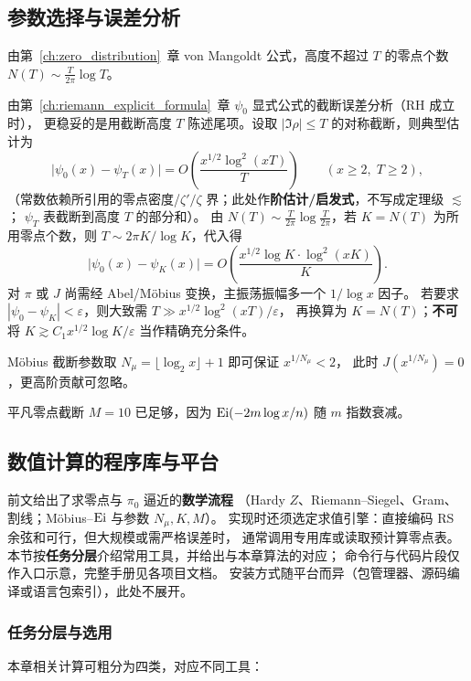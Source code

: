 \subsection{参数选择与误差分析}

由第~\ref{ch:zero_distribution}~章 von Mangoldt 公式，高度不超过 $T$ 的零点个数 $N(T) \sim \frac{T}{2\pi}\log T$。

由第~\ref{ch:riemann_explicit_formula}~章 $\psi_0$ 显式公式的截断误差分析（RH 成立时），
更稳妥的是用截断高度 $T$ 陈述尾项。设取 $|\Im\rho|\le T$ 的对称截断，则典型估计为
\[
\bigl|\psi_0(x)-\psi_T(x)\bigr|
=
O\!\left(
\frac{x^{1/2}\log^2(xT)}{T}
\right)
\qquad(x\ge2,\;T\ge2),
\]
（常数依赖所引用的零点密度/$\zeta'/\zeta$ 界；此处作\textbf{阶估计/启发式}，不写成定理级 $\lesssim$；
$\psi_T$ 表截断到高度 $T$ 的部分和）。
由 $N(T)\sim\frac{T}{2\pi}\log\frac{T}{2\pi}$，若 $K=N(T)$ 为所用零点个数，则
$T\sim 2\pi K/\log K$，代入得
\[
\bigl|\psi_0(x)-\psi_K(x)\bigr|
=
O\!\left(
\frac{x^{1/2}\log K\cdot\log^2(xK)}{K}
\right).
\]
对 $\pi$ 或 $J$ 尚需经 Abel/Möbius 变换，主振荡振幅多一个 $1/\log x$ 因子。
若要求 $|\psi_0-\psi_K|<\varepsilon$，则大致需 $T\gg x^{1/2}\log^2(xT)/\varepsilon$，
再换算为 $K=N(T)$；\textbf{不可}将 $K\gtrsim C_1 x^{1/2}\log K/\varepsilon$ 当作精确充分条件。

Möbius 截断参数取 $N_{\mu} = \lfloor \log_2 x \rfloor + 1$ 即可保证 $x^{1/N_{\mu}} < 2$，
此时 $J(x^{1/N_{\mu}})=0$，更高阶贡献可忽略。

平凡零点截断 $M=10$ 已足够，因为 $\operatorname{Ei}(-2m\log x/n)$ 随 $m$ 指数衰减。

\subsection{数值计算的程序库与平台}\label{sec:libraries}

前文给出了求零点与 $\pi_0$ 逼近的\textbf{数学流程}
（Hardy $Z$、Riemann--Siegel、Gram、割线；Möbius--$\operatorname{Ei}$ 与参数 $N_{\mu},K,M$）。
实现时还须选定求值引擎：直接编码 RS 余弦和可行，但大规模或需严格误差时，
通常调用专用库或读取预计算零点表。
本节按\textbf{任务分层}介绍常用工具，并给出与本章算法的对应；
命令行与代码片段仅作入口示意，完整手册见各项目文档。
安装方式随平台而异（包管理器、源码编译或语言包索引），此处不展开。

\subsubsection{任务分层与选用}

本章相关计算可粗分为四类，对应不同工具：

